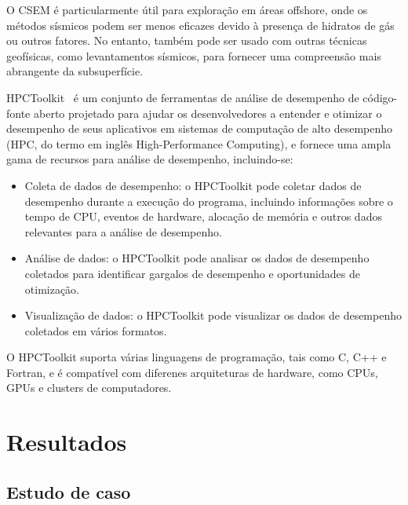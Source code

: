 \documentclass[12pt]{article}
\begin{document}
O CSEM é particularmente útil para exploração em áreas offshore, onde os métodos sísmicos podem ser menos eficazes devido à presença de hidratos de gás ou outros fatores. No entanto, também pode ser usado com outras técnicas geofísicas, como levantamentos sísmicos, para fornecer uma compreensão mais abrangente da subsuperfície.


HPCToolkit~\cite{hpctoolkit2010} é um conjunto de ferramentas de análise de desempenho de código-fonte aberto projetado para ajudar os desenvolvedores a entender e otimizar o desempenho de seus aplicativos em sistemas de computação de alto desempenho (HPC, do termo em inglês High-Performance Computing), e fornece uma ampla gama de recursos para análise de desempenho, incluindo-se:
\begin{itemize}
 \item Coleta de dados de desempenho: o HPCToolkit pode coletar dados de desempenho durante a execução do programa, incluindo informações sobre o tempo de CPU, eventos de hardware, alocação de memória e outros dados relevantes para a análise de desempenho.
  \item Análise de dados: o HPCToolkit pode analisar os dados de desempenho coletados para identificar gargalos de desempenho e oportunidades de otimização.
 \item Visualização de dados: o HPCToolkit pode visualizar os dados de desempenho coletados em vários formatos.
\end{itemize}
O HPCToolkit suporta várias linguagens de programação, tais como C, C++ e Fortran, e é compatível com diferenes arquiteturas de hardware, como CPUs, GPUs e clusters de computadores.

\section{Resultados}

\subsection{Estudo de caso}
\end{document}
